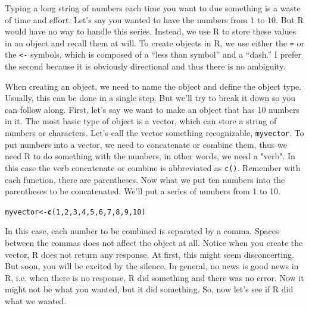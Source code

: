 \documentclass{tufte-handout}\usepackage[]{graphicx}\usepackage[]{color}
\makeatletter
\newcommand{\hlnum}[1]{\textcolor[rgb]{0.686,0.059,0.569}{#1}}%
\newcommand{\hlstd}[1]{\textcolor[rgb]{0.345,0.345,0.345}{#1}}%
\newcommand{\hlkwb}[1]{\textcolor[rgb]{0.69,0.353,0.396}{#1}}%
\newcommand{\hlkwd}[1]{\textcolor[rgb]{0.737,0.353,0.396}{\textbf{#1}}}%
\newenvironment{kframe}{%
 \def\at@end@of@kframe{}%
 \ifinner\ifhmode%
  \def\at@end@of@kframe{\end{minipage}}%
  \begin{minipage}{\columnwidth}%
 \fi\fi%
 \def\FrameCommand##1{\hskip\@totalleftmargin \hskip-\fboxsep
 \colorbox{shadecolor}{##1}\hskip-\fboxsep
     \hskip-\linewidth \hskip-\@totalleftmargin \hskip\columnwidth}%
 \MakeFramed {\advance\hsize-\width
   \@totalleftmargin\z@ \linewidth\hsize
   \@setminipage}}%
 {\par\unskip\endMakeFramed%
 \at@end@of@kframe}
\newenvironment{knitrout}{}{} %
\makeatother
\begin{document}
Typing a long string of numbers each time you want to due something is a waste of time and effort. Let's say you wanted to have the numbers from 1 to 10. But R would have no way to handle this series. Instead, we use R to store these values in an object and recall them at will. To create objects in R, we use either the \texttt{=} or the \texttt{<-} symbols, which is composed of a ``less than symbol'' and a ``dash.'' I prefer the second because it is obviously directional and thus there is no ambiguity.

When creating an object, we need to name the object and define the object type. Usually, this can be done in a single step. But we'll try to break it down so you can follow along. First, let's say we want to make an object that has 10 numbers in it. The most basic type of object is a vector, which can store a string of numbers or characters. Let's call the vector something recognizable, \texttt{myvector}. To put numbers into a vector, we need to concatenate or combine them, thus we need R to do something with the numbers, in other words, we need a "verb". In this case the verb concatenate or combine is abbreviated as \texttt{c()}. Remember with each function, there are parentheses. Now what we put ten numbers into the parentheses to be concatenated. We'll put a series of numbers from 1 to 10. 

\begin{knitrout}
\color{fgcolor}\begin{kframe}
\begin{alltt}
\hlstd{myvector} \hlkwb{<-} \hlkwd{c}\hlstd{(}\hlnum{1}\hlstd{,} \hlnum{2}\hlstd{,} \hlnum{3}\hlstd{,} \hlnum{4}\hlstd{,} \hlnum{5}\hlstd{,} \hlnum{6}\hlstd{,} \hlnum{7}\hlstd{,} \hlnum{8}\hlstd{,} \hlnum{9}\hlstd{,} \hlnum{10}\hlstd{)}
\end{alltt}
\end{kframe}
\end{knitrout}

In this case, each number to be combined is separated by a comma. Spaces between the commas does not affect the object at all. Notice when you create the vector, R does not return any response. At first, this might seem disconcerting. But soon, you will be excited by the silence. In general, no news is good news in R, i.e. when there is no response, R did something and there was no error. Now it might not be what you wanted, but it did something. So, now let's see if R did what we wanted. 
\end{document}
